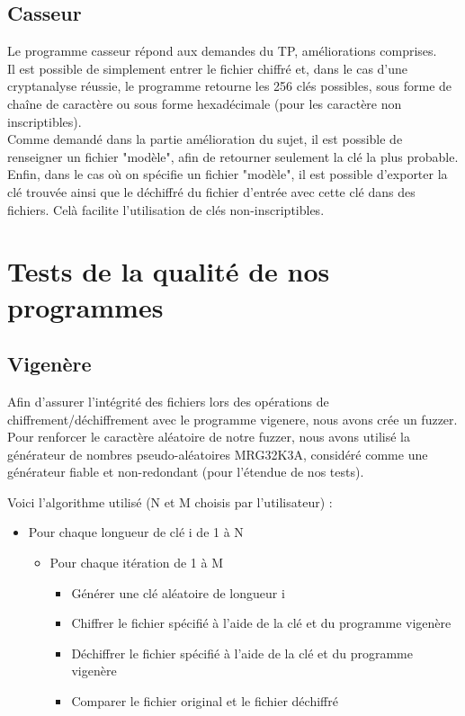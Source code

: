 \documentclass[a4paper, 11pt, oneside]{article}
\begin{document}
\subsection{Casseur}

Le programme casseur répond aux demandes du TP, améliorations comprises.\\
Il est possible de simplement entrer le fichier chiffré et, dans le cas d'une cryptanalyse réussie, le programme retourne les 256 clés possibles, sous forme de chaîne de caractère ou sous forme hexadécimale (pour les caractère non inscriptibles).\\
Comme demandé dans la partie amélioration du sujet, il est possible de renseigner un fichier "modèle", afin de retourner seulement la clé la plus probable.\\
Enfin, dans le cas où on spécifie un fichier "modèle", il est possible d'exporter la clé trouvée ainsi que le déchiffré du fichier d'entrée avec cette clé dans des fichiers. Celà facilite l'utilisation de clés non-inscriptibles.

\section{Tests de la qualité de nos programmes}

\subsection{Vigenère}

Afin d'assurer l'intégrité des fichiers lors des opérations de chiffrement/déchiffrement avec le programme vigenere, nous avons crée un fuzzer.\\
Pour renforcer le  caractère aléatoire de notre fuzzer, nous avons utilisé la générateur de nombres pseudo-aléatoires MRG32K3A, considéré comme une générateur fiable et non-redondant (pour l'étendue de nos tests).

Voici l'algorithme utilisé (N et M choisis par l'utilisateur) :\\

\begin{itemize}
 \item Pour chaque longueur de clé i de 1 à N
 \begin{itemize}
  \item Pour chaque itération de 1 à M
  \begin{itemize}
   \item Générer une clé aléatoire de longueur i
   \item Chiffrer le fichier spécifié à l'aide de la clé et du programme vigenère
   \item Déchiffrer le fichier spécifié à l'aide de la clé et du programme vigenère
   \item Comparer le fichier original et le fichier déchiffré
  \end{itemize}

 \end{itemize}

\end{itemize}
\end{document}
